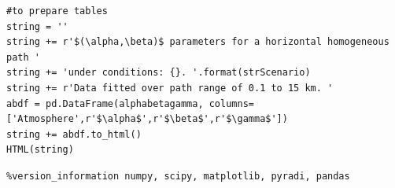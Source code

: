\documentclass{workpackage}
\begin{document}
\begin{lstlisting}[style=incellstyle,caption={Code Listing in cell 49 \label{lst:autolistingcell49}}]
#to prepare tables
string = ''
string += r'$(\alpha,\beta)$ parameters for a horizontal homogeneous path '
string += 'under conditions: {}. '.format(strScenario)
string += r'Data fitted over path range of 0.1 to 15 km. '
abdf = pd.DataFrame(alphabetagamma, columns=['Atmosphere',r'$\alpha$',r'$\beta$',r'$\gamma$'])
string += abdf.to_html()
HTML(string)
\end{lstlisting}


\begin{lstlisting}[style=incellstyle,caption={Code Listing in cell 51 \label{lst:autolistingcell51}}]
%load_ext version_information
%version_information numpy, scipy, matplotlib, pyradi, pandas
\end{lstlisting}


\begin{lstlisting}[style=incellstyle,caption={Code Listing in cell 52 \label{lst:autolistingcell52}}]

\end{lstlisting}
\end{document}
